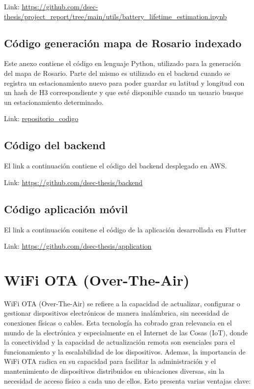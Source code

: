 \begin{appendixd}
            Link: \url{https://github.com/dsec-thesis/project_report/tree/main/utils/battery_lifetime_estimation.ipynb}


        \subsection{Código generación mapa de Rosario indexado}
            Este anexo contiene el código en lenguaje Python, utilizado para la generación del mapa de Rosario. 
            Parte del mismo es utilizado en el backend cuando se registra un estacionamiento nuevo para poder guardar su latitud y 
            longitud con un hash de H3 correspondiente y que esté disponible cuando un usuario busque un estacionamiento determinado.

            Link: \url{repositorio_codigo}

        \subsection{Código del backend}
            El link a continuación contiene el código del backend desplegado en AWS.

            Link: \url{https://github.com/dsec-thesis/backend}

        \subsection{Código aplicación móvil}
            El link a continuación conitene el código de la aplicación desarrollada en Flutter

            Link: \url{https://github.com/dsec-thesis/application}
    \clearpage
    \section{WiFi OTA (Over-The-Air)}{\label{configuracion_wifi}}
        WiFi OTA (Over-The-Air) se refiere a la capacidad de actualizar, configurar o gestionar dispositivos electrónicos de manera inalámbrica, 
        sin necesidad de conexiones físicas o cables. Esta tecnología ha cobrado gran relevancia en el mundo de la electrónica y 
        especialmente en el Internet de las Cosas (IoT), donde la conectividad y la capacidad de actualización remota son 
        esenciales para el funcionamiento y la escalabilidad de los dispositivos. Ademas, la importancia de WiFi OTA radica 
        en su capacidad para facilitar la administración y el mantenimiento de dispositivos distribuidos en ubicaciones diversas,
        sin la necesidad de acceso físico a cada uno de ellos. Esto presenta varias ventajas clave:


\end{appendixd}
